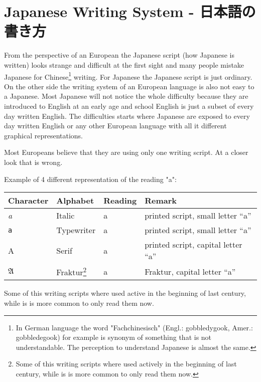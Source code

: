 \chapter{Japanese Writing System - 日本語の書き方}\label{chap:JapaneseWritingSystem}

From the perspective of an European the Japanese script (how Japanese is
written) looks strange and difficult at the first sight and many people mistake
Japanese for Chinese\footnote{In German language the word "Fachchinesisch"
(Engl.: gobbledygook, Amer.: gobbledegook) for example is synonym of something
that is not understandable. The perception to understand Japanese is almost the
same.} writing.  For Japanese the Japanese script is just ordinary. On the
other side the writing system of an European language is also not easy to a
Japanese. Most Japanese will not notice the whole difficulty because they are
introduced to English at an early age and school English is just a subset of
every day written English. The difficulties starts where Japanese are exposed
to every day written English or any other European language with all it
different graphical representations.

Most Europeans believe that they are using only one writing script. At a closer
look that is wrong.

\bigskip Example of 4 different representation of the reading "a":

\begin{center}
\begin{tabular}{|l|l|l|l|}
\textbf{Character}&\textbf{Alphabet}&\textbf{Reading}&\textbf{Remark}\\\hline
\textit{a}     &  Italic        & a & printed script, small letter ``a'' \\ 
\texttt{a}     &  Typewriter    & a & printed script, small letter ``a'' \\ 
A              &  Serif         & a & printed script, capital letter ``a'' \\ 
$\mathfrak{A}$ & Fraktur\footnote{Some of this writing scripts where used 
actively in the beginning of last century, while is is more common to only 
read them now.}& a & Fraktur, capital letter ``a''  \\ 
\end{tabular}
\end{center}

Some of this writing scripts where used active in the beginning of last
century, while is is more common to only read them now. 

